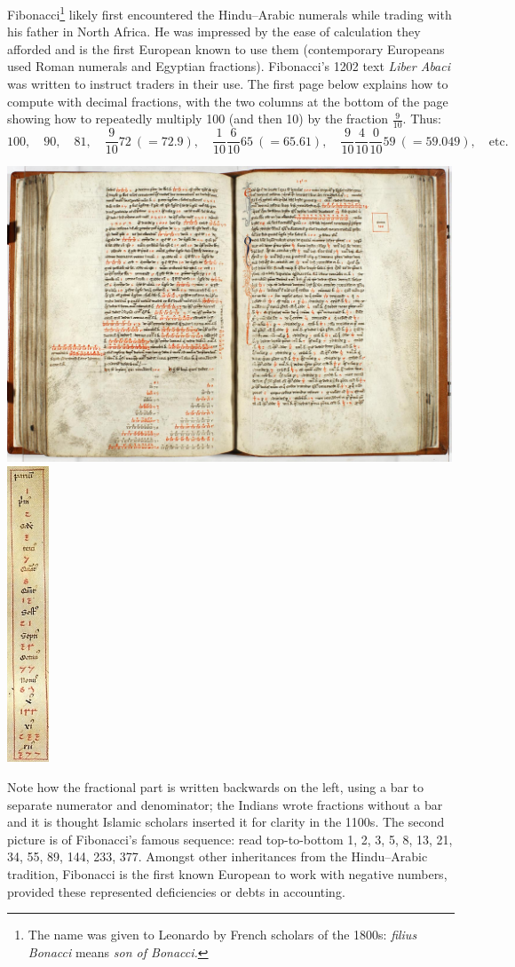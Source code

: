 Fibonacci\footnote{The name was given to Leonardo by French scholars of the 1800s: \emph{filius Bonacci} means \emph{son of Bonacci.}} likely first encountered the Hindu--Arabic numerals while trading with his father in North Africa. He was impressed by the ease of calculation they afforded and is the first European known to use them (contemporary Europeans used Roman numerals and Egyptian fractions). Fibonacci's 1202 text \emph{Liber Abaci} was written to instruct traders in their use. The first page below explains how to compute with decimal fractions, with the two columns at the bottom of the page showing how to repeatedly multiply 100 (and then 10) by the fraction $\frac 9{10}$. Thus:
\[
	100,\quad 90,\quad 81,\quad \frac 9{10}72\ (=72.9),\quad \frac 1{10}\!\frac 6{10}65\ (=65.61),\quad\frac 9{10}\!\frac 4{10}\!\frac 0{10}59\ (=59.049),\quad\text{etc.}
\]
\begin{center}
	\includegraphics[height=250pt]{liberabaci3}
	\quad
	\includegraphics[height=250pt]{liberabaci1}
\end{center}
Note how the fractional part is written backwards on the left, using a bar to separate numerator and denominator; the Indians wrote fractions without a bar and it is thought Islamic scholars inserted it for clarity in the 1100s. The second picture is of Fibonacci's famous sequence: read top-to-bottom 1, 2, 3, 5, 8, 13, 21, 34, 55, 89, 144, 233, 377. Amongst other inheritances from the Hindu--Arabic tradition, Fibonacci is the first known European to work with negative numbers, provided these represented deficiencies or debts in accounting.



